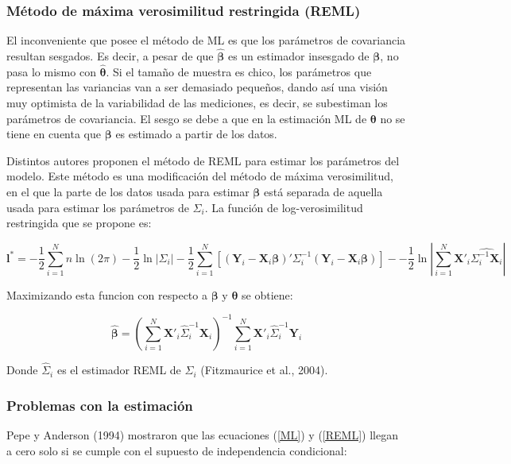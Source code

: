 \documentclass[spanish]{article}
\numberwithin{figure}{subsection}
\numberwithin{equation}{subsection}
\numberwithin{table}{subsection}
\begin{document}
\subsubsection{Método de máxima verosimilitud restringida (REML)}

El inconveniente que posee el método de ML es que los parámetros de covariancia
resultan sesgados. Es decir, a pesar de que $\bm{\hat{\beta}}$ es un estimador
insesgado de $\bm{\beta}$, no pasa lo mismo con $\bm{\hat{\theta}}$. Si el
tamaño de muestra es chico, los parámetros que representan las variancias van a
ser demasiado pequeños, dando así una visión muy optimista de la variabilidad de
las mediciones, es decir, se subestiman los parámetros de covariancia. El sesgo
se debe a que en la estimación ML de $\bm{\theta}$ no se tiene en cuenta que
$\bm{\beta}$ es estimado a partir de los datos.

Distintos autores proponen el método de REML para estimar los parámetros del
modelo. Este método es una modificación del método de máxima verosimilitud, en
el que la parte de los datos usada para estimar $\bm{\beta}$ está separada de
aquella usada para estimar los parámetros de $\bm{\varSigma}_i$. La función de
log-verosimilitud restringida que se propone es:

\begin{equation}
\label{REML}
	\bm{l}^* = -\frac{1}{2} \sum_{i=1}^{N}n \ln(2\pi) - \frac{1}{2}\ln|\bm{\varSigma}_i| -
	\frac{1}{2} \sum_{i=1}^{N} [(\bm{Y}_i - \bm{X}_i\bm{\beta})'
	\bm{\varSigma}_i^{-1} (\bm{Y}_i - \bm{X}_i\bm{\beta})] -
	- \frac{1}{2} \ln |\sum_{i=1}^{N} \bm{X}'_i \hat{\bm{\varSigma}_i^{-1} \bm{X}_i}|
\end{equation}

Maximizando esta funcion con respecto a $\bm{\beta}$ y $\bm{\theta}$ se obtiene:

\[ \hat{\bm{\beta}} = (\sum_{i=1}^{N} \bm{X}'_i \hat{\bm{\varSigma}}_i^{-1} \bm{X}_i)^{-1}
\sum_{i=1}^{N} \bm{X}'_i \hat{\bm{\varSigma}}_i^{-1} \bm{Y}_i\]

Donde $\hat{\bm{\varSigma}}_i$ es el estimador REML de ${\bm{\varSigma}_i}$ (Fitzmaurice et al., 2004).

\subsubsection{Problemas con la estimación}

Pepe y Anderson (1994) mostraron que las ecuaciones (\ref{ML}) y (\ref{REML}) llegan
a cero solo si se cumple con el supuesto de independencia condicional:
\end{document}
